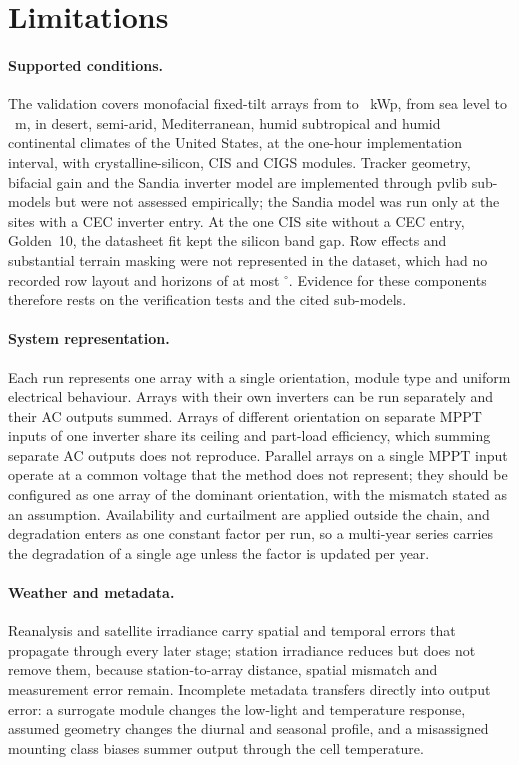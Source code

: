 \documentclass[11pt]{article}
\begin{document}
\section{Limitations}
\label{sec:limitations}

\paragraph{Supported conditions.}
\label{sec:supported}
The validation covers monofacial fixed-tilt arrays from \vDcMin{} to \vDcMax~kWp, from sea level to \vAltMax~m, in desert, semi-arid, Mediterranean, humid subtropical and humid continental climates of the United States, at the one-hour implementation interval, with crystalline-silicon, CIS and CIGS modules. Tracker geometry, bifacial gain and the Sandia inverter model are implemented through pvlib sub-models but were not assessed empirically; the Sandia model was run only at the \vNSdm{} sites with a CEC inverter entry. At the one CIS site without a CEC entry, Golden~10, the datasheet fit kept the silicon band gap. Row effects and substantial terrain masking were not represented in the dataset, which had no recorded row layout and horizons of at most \vHorizonMax$^{\circ}$. Evidence for these components therefore rests on the verification tests and the cited sub-models.

\paragraph{System representation.}
Each run represents one array with a single orientation, module type and uniform electrical behaviour. Arrays with their own inverters can be run separately and their AC outputs summed. Arrays of different orientation on separate MPPT inputs of one inverter share its ceiling and part-load efficiency, which summing separate AC outputs does not reproduce. Parallel arrays on a single MPPT input operate at a common voltage that the method does not represent; they should be configured as one array of the dominant orientation, with the mismatch stated as an assumption. Availability and curtailment are applied outside the chain, and degradation enters as one constant factor per run, so a multi-year series carries the degradation of a single age unless the factor is updated per year.

\paragraph{Weather and metadata.}
Reanalysis and satellite irradiance carry spatial and temporal errors that propagate through every later stage; station irradiance reduces but does not remove them, because station-to-array distance, spatial mismatch and measurement error remain. Incomplete metadata transfers directly into output error: a surrogate module changes the low-light and temperature response, assumed geometry changes the diurnal and seasonal profile, and a misassigned mounting class biases summer output through the cell temperature.
\end{document}
